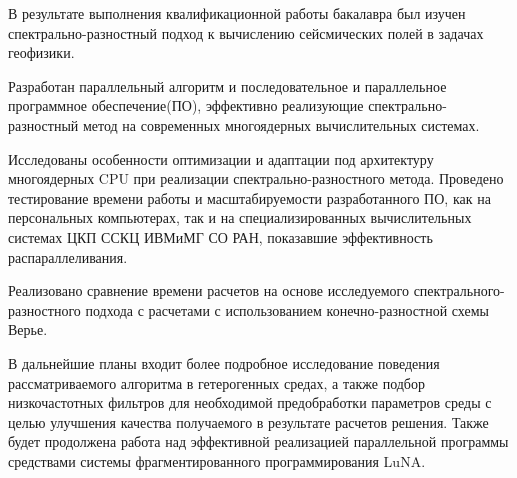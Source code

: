 
В результате выполнения квалификационной работы бакалавра был изучен спектрально-разностный подход к вычислению сейсмических полей в задачах геофизики.

Разработан параллельный алгоритм и последовательное и параллельное программное обеспечение(ПО), эффективно реализующие спектрально-
разностный метод на современных многоядерных вычислительных системах.

Исследованы особенности оптимизации и адаптации под архитектуру многоядерных CPU при реализации спектрально-разностного метода. Проведено тестирование времени работы и масштабируемости разработанного ПО, как на персональных компьютерах,
так и на специализированных вычислительных системах ЦКП ССКЦ ИВМиМГ СО РАН, показавшие эффективность распараллеливания.

Реализовано сравнение времени расчетов на основе исследуемого спектрального-разностного подхода с расчетами с использованием конечно-разностной схемы Верье. 



В дальнейшие планы входит более подробное исследование поведения рассматриваемого алгоритма в гетерогенных средах,
а также подбор низкочастотных фильтров для необходимой предобработки параметров среды с целью улучшения качества получаемого в результате расчетов решения.
Также будет продолжена работа над эффективной реализацией параллельной программы
средствами системы фрагментированного программирования LuNA.

\clearpage
